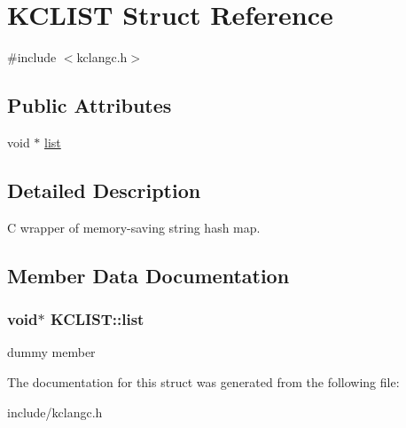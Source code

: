 \hypertarget{structKCLIST}{\section{\-K\-C\-L\-I\-S\-T \-Struct \-Reference}
\label{structKCLIST}
}


{\ttfamily \#include $<$kclangc.\-h$>$}

\subsection*{\-Public \-Attributes}
\begin{DoxyCompactItemize}
\item 
void $\ast$ \hyperlink{structKCLIST_ab645950cc959a3f9d367fa6c56ef4a71}{list}
\end{DoxyCompactItemize}


\subsection{\-Detailed \-Description}
\-C wrapper of memory-\/saving string hash map. 

\subsection{\-Member \-Data \-Documentation}
\hypertarget{structKCLIST_ab645950cc959a3f9d367fa6c56ef4a71}{
\subsubsection[{list}]{\setlength{\rightskip}{0pt plus 5cm}void$\ast$ {\bf \-K\-C\-L\-I\-S\-T\-::list}}}\label{structKCLIST_ab645950cc959a3f9d367fa6c56ef4a71}
dummy member 

\-The documentation for this struct was generated from the following file\-:\begin{DoxyCompactItemize}
\item 
include/kclangc.\-h\end{DoxyCompactItemize}
